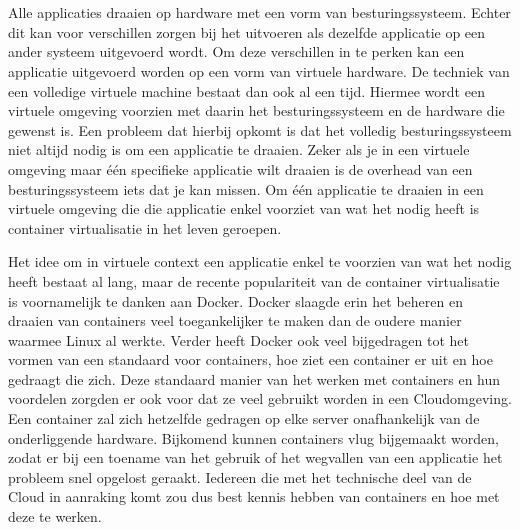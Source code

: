 
\chapter{}
\label{ch:inleiding}

Alle applicaties draaien op hardware met een vorm van besturingssysteem. Echter dit kan voor verschillen zorgen bij het uitvoeren als dezelfde applicatie op een ander systeem uitgevoerd wordt. Om deze verschillen in te perken kan een applicatie uitgevoerd worden op een vorm van virtuele hardware. De techniek van een volledige virtuele machine bestaat dan ook al een tijd. Hiermee wordt een virtuele omgeving voorzien met daarin het besturingssysteem en de hardware die gewenst is. Een probleem dat hierbij opkomt is dat het volledig besturingssysteem niet altijd nodig is om een applicatie te draaien. Zeker als je in een virtuele omgeving maar één specifieke applicatie wilt draaien is de overhead van een besturingssysteem iets dat je kan missen. Om één applicatie te draaien in een virtuele omgeving die die applicatie enkel voorziet van wat het nodig heeft is container virtualisatie in het leven geroepen.
 
Het idee om in virtuele context een applicatie enkel te voorzien van wat het nodig heeft bestaat al lang, maar de recente populariteit van de container virtualisatie is voornamelijk te danken aan Docker. Docker slaagde erin het beheren en draaien van containers veel toegankelijker te maken dan de oudere manier waarmee Linux al werkte. Verder heeft Docker ook veel bijgedragen tot het vormen van een standaard voor containers, hoe ziet een container er uit en hoe gedraagt die zich. Deze standaard manier van het werken met containers en hun voordelen zorgden er ook voor dat ze veel gebruikt worden in een Cloudomgeving. Een container zal zich hetzelfde gedragen op elke server onafhankelijk van de onderliggende hardware. Bijkomend kunnen containers vlug bijgemaakt worden, zodat er bij een toename van het gebruik of het wegvallen van een applicatie het probleem snel opgelost geraakt. Iedereen die met het technische deel van de Cloud in aanraking komt zou dus best kennis hebben van containers en hoe met deze te werken.

\section{}
\label{sec:probleemstelling}

